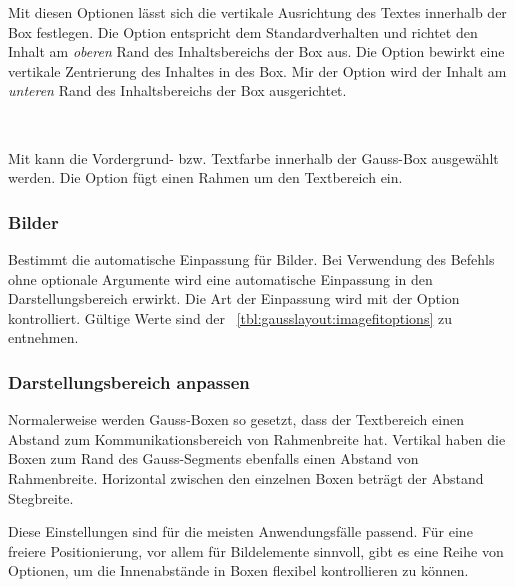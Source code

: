 Mit diesen Optionen lässt sich die vertikale Ausrichtung des Textes innerhalb
der Box festlegen. Die Option  entspricht dem Standardverhalten und richtet
den Inhalt am \emph{oberen} Rand des Inhaltsbereichs der Box aus.
Die Option  bewirkt eine vertikale Zentrierung des Inhaltes in des Box.
Mir der Option  wird der Inhalt am \emph{unteren} Rand des
Inhaltsbereichs der Box ausgerichtet.

\begin{Declaration}
  \\
\end{Declaration}

Mit  kann die Vordergrund- bzw. Textfarbe
innerhalb der Gauss-Box ausgewählt werden.
Die Option  fügt einen Rahmen um den Textbereich
ein.%


\subsubsection{Bilder}

\begin{Declaration}
\end{Declaration}

Bestimmt die automatische Einpassung für Bilder.
Bei Verwendung des Befehls  ohne optionale
Argumente wird eine automatische Einpassung in den Darstellungsbereich
erwirkt.
Die Art der Einpassung wird mit der Option  kontrolliert.
Gültige Werte sind der \tablename~\ref{tbl:gausslayout:imagefitoptions}
zu entnehmen.


\subsubsection{Darstellungsbereich anpassen}

Normalerweise werden Gauss-Boxen so gesetzt, dass der Textbereich
einen Abstand zum Kommunikationsbereich von Rahmenbreite hat.
Vertikal haben die Boxen zum Rand des Gauss-Segments ebenfalls einen
Abstand von Rahmenbreite.
Horizontal zwischen den einzelnen Boxen beträgt der Abstand Stegbreite.

Diese Einstellungen sind für die meisten Anwendungsfälle passend.
Für eine freiere Positionierung, vor allem für Bildelemente sinnvoll, gibt
es eine Reihe von Optionen, um die Innenabstände in Boxen flexibel
kontrollieren zu können.

